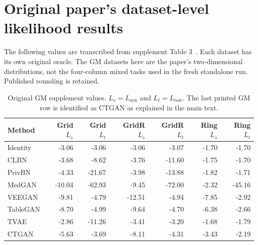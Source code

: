 \documentclass[11pt,letterpaper]{article}
\newcommand{\Lsyn}{L_{\mathrm{syn}}}
\newcommand{\Ltest}{L_{\mathrm{test}}}
\begin{document}
\section{Original paper's dataset-level likelihood results}\label{app:paper}
The following values are transcribed from supplement Table 3~\cite{xusupplement}. Each dataset has its own original oracle. The GM datasets here are the paper's two-dimensional distributions, not the four-column mixed tasks used in the fresh standalone run. Published rounding is retained.
\begin{table}[H]\centering
\caption{Original GM supplement values. $L_s=\Lsyn$ and $L_t=\Ltest$. The last printed GM row is identified as CTGAN as explained in the main text.}\label{tab:papergmfull}
\small
\begin{tabular}{lrrrrrr}\toprule
Method & Grid $L_{s}$ & Grid $L_{t}$ & GridR $L_{s}$ & GridR $L_{t}$ & Ring $L_{s}$ & Ring $L_{t}$\\\midrule
Identity & -3.06 & -3.06 & -3.06 & -3.07 & -1.70 & -1.70\\
CLBN & -3.68 & -8.62 & -3.76 & -11.60 & -1.75 & -1.70\\
PrivBN & -4.33 & -21.67 & -3.98 & -13.88 & -1.82 & -1.71\\
MedGAN & -10.04 & -62.93 & -9.45 & -72.00 & -2.32 & -45.16\\
VEEGAN & -9.81 & -4.79 & -12.51 & -4.94 & -7.85 & -2.92\\
TableGAN & -8.70 & -4.99 & -9.64 & -4.70 & -6.38 & -2.66\\
TVAE & -2.86 & -11.26 & -3.41 & -3.20 & -1.68 & -1.79\\
CTGAN & -5.63 & -3.69 & -8.11 & -4.31 & -3.43 & -2.19\\
\bottomrule\end{tabular}
\end{table}
\end{document}
